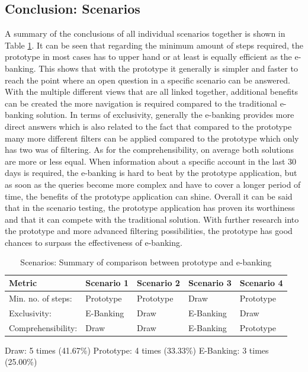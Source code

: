 
\subsection{Conclusion: Scenarios}

A summary of the conclusions of all individual scenarios together is shown in Table \ref{tbl:scenariosummary}. It can be seen that regarding the minimum amount of steps required, the prototype in most cases has to upper hand or at least is equally efficient as the e-banking. This shows that with the prototype it generally is simpler and faster to reach the point where an open question in a specific scenario can be answered. With the multiple different views that are all linked together, additional benefits can be created the more navigation is required compared to the traditional e-banking solution. In terms of exclusivity, generally the e-banking provides more direct answers which is also related to the fact that compared to the prototype many more different filters can be applied compared to the prototype which only has two was of filtering. As for the comprehensibility, on average both solutions are more or less equal. When information about a specific account in the last 30 days is required, the e-banking is hard to beat by the prototype application, but as soon as the queries become more complex and have to cover a longer period of time, the benefits of the prototype application can shine. \newline
Overall it can be said that in the scenario testing, the prototype application has proven its worthiness and that it can compete with the traditional solution. With further research into the prototype and more advanced filtering possibilities, the prototype has good chances to surpass the effectiveness of e-banking.
\begin{table}[h]
	\begin{center}
		\begin{tabular}{ | p{3.2cm} | p{2.5cm} | p{2.5cm} | p{2.5cm} | p{2.5cm} | }
			\hline
			\textbf{Metric} & \textbf{Scenario 1} & \textbf{Scenario 2} & \textbf{Scenario 3} & \textbf{Scenario 4} \\
			\hline
			Min. no. of steps: & Prototype & Prototype & Draw & Prototype \\
			\hline
			Exclusivity: & E-Banking & Draw & E-Banking & Draw \\
			\hline
			Comprehensibility: & Draw & Draw & E-Banking & Prototype \\
			\hline
		\end{tabular}
		\caption{Scenarios: Summary of comparison between prototype and e-banking}
		\label{tbl:scenariosummary}
	\end{center}
\end{table} \newline
Draw: 5 times (41.67\%) \newline
Prototype: 4 times (33.33\%) \newline
E-Banking: 3 times (25.00\%)


